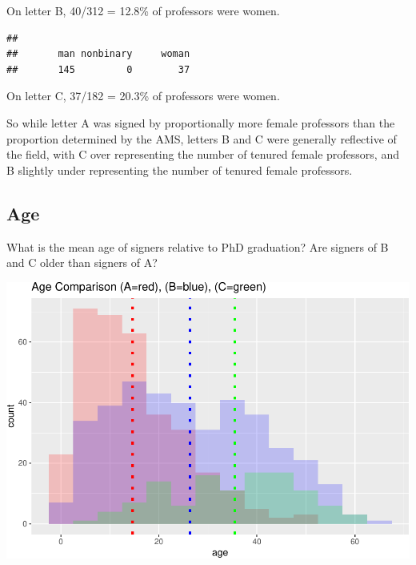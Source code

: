 \documentclass[]{article}
\newenvironment{Shaded}{\begin{snugshade}}{\end{snugshade}}
\newcommand{\KeywordTok}[1]{\textcolor[rgb]{0.13,0.29,0.53}{\textbf{#1}}}
\newcommand{\NormalTok}[1]{#1}
\newcommand{\OperatorTok}[1]{\textcolor[rgb]{0.81,0.36,0.00}{\textbf{#1}}}
\newcommand{\StringTok}[1]{\textcolor[rgb]{0.31,0.60,0.02}{#1}}
\begin{document}
On letter B, 40/312 = 12.8\% of professors were women.

\begin{Shaded}
\end{Shaded}

\begin{verbatim}
## 
##       man nonbinary     woman 
##       145         0        37
\end{verbatim}

On letter C, 37/182 = 20.3\% of professors were women.

So while letter A was signed by proportionally more female professors
than the proportion determined by the AMS, letters B and C were
generally reflective of the field, with C over representing the number
of tenured female professors, and B slightly under representing the
number of tenured female professors.

\hypertarget{age}{%
\subsection{Age}\label{age}}

What is the mean age of signers relative to PhD graduation? Are signers
of B and C older than signers of A?

\includegraphics{final_files/figure-latex/unnamed-chunk-22-1.pdf}
\end{document}
